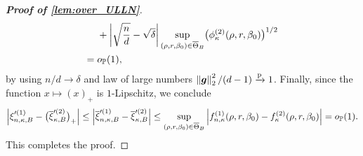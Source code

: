 \begin{proof}[\textbf{Proof of \cref{lem:over_ULLN}}]
\begin{align*}
        {} &  
        + \left|{ \sqrt{\frac{n}{d}} - \sqrt{\delta} }\right| \sup_{ (\rho, r, \beta_0) \in \overline\Theta_{B} }\bigl( \phi^{(2)}_{\kappa}(\rho, r, \beta_0) \bigr)^{1/2} \\
        = {} & o_{\mathbb{P}}(1),
\end{align*}
by using $n/d \to \delta$ and law of large numbers $\left\|{{\boldsymbol{g}}}\right\|_2^2/(d - 1) \xrightarrow{\mathrm{p}} 1$. Finally, since the function $x \mapsto (x)_+$ is $1$-Lipschitz, we conclude
\begin{equation*}
    \Bigl| \xi'^{(1)}_{n, \kappa, B} - \bigl( \overline\xi'^{(2)}_{\kappa, B} \bigr)_+  \Bigr|
    \le
    \left|{ \overline\xi'^{(1)}_{n, \kappa, B} - \overline\xi'^{(2)}_{\kappa, B} }\right|
    \le \sup_{ (\rho, r, \beta_0) \in \overline\Theta_{B} } \left|{ f^{(1)}_{n,\kappa}(\rho,r,\beta_0) - f^{(2)}_{\kappa}(\rho,r,\beta_0)}\right| = o_{\mathbb{P}}(1).
\end{equation*}
This completes the proof.
\end{proof}









